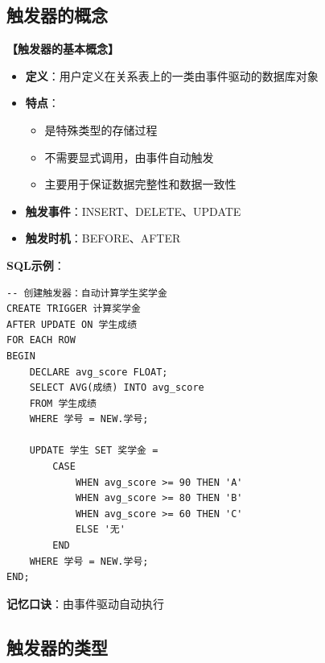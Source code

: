 \documentclass[12pt, a4paper]{article}
\newenvironment{bluebox}[1]{%
  \begin{trivlist}
  \item[\hskip\labelsep \textbf{#1}]
  \setlength{\parskip}{0.5ex}
  \setlength{\itemsep}{0.5ex}
}{%
  \end{trivlist}
  }
\begin{document}
\subsection{触发器的概念}

\begin{bluebox}{触发器定义}
	\textbf{【触发器的基本概念】}

	\begin{itemize}[leftmargin=*, nosep]
		\item \textbf{定义}：用户定义在关系表上的一类由事件驱动的数据库对象
		\item \textbf{特点}：
		      \begin{itemize}[nosep]
			      \item 是特殊类型的存储过程
			      \item 不需要显式调用，由事件自动触发
			      \item 主要用于保证数据完整性和数据一致性
		      \end{itemize}
		\item \textbf{触发事件}：INSERT、DELETE、UPDATE
		\item \textbf{触发时机}：BEFORE、AFTER
	\end{itemize}

	\textbf{SQL示例}：
	\begin{verbatim}
-- 创建触发器：自动计算学生奖学金
CREATE TRIGGER 计算奖学金
AFTER UPDATE ON 学生成绩
FOR EACH ROW
BEGIN
    DECLARE avg_score FLOAT;
    SELECT AVG(成绩) INTO avg_score
    FROM 学生成绩
    WHERE 学号 = NEW.学号;

    UPDATE 学生 SET 奖学金 =
        CASE
            WHEN avg_score >= 90 THEN 'A'
            WHEN avg_score >= 80 THEN 'B'
            WHEN avg_score >= 60 THEN 'C'
            ELSE '无'
        END
    WHERE 学号 = NEW.学号;
END;
	\end{verbatim}

	\textbf{记忆口诀}：由事件驱动自动执行
\end{bluebox}

\subsection{触发器的类型}
\end{document}
